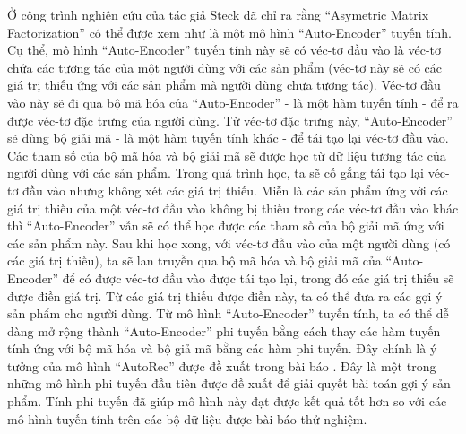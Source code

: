 Ở công trình nghiên cứu \cite{AMF} của tác giả Steck đã chỉ ra rằng “Asymetric Matrix Factorization” có thể được xem như là một mô hình “Auto-Encoder” tuyến tính. 
Cụ thể, mô hình ``Auto-Encoder'' tuyến tính này sẽ có véc-tơ đầu vào là véc-tơ chứa các tương tác của một người dùng với các sản phẩm (véc-tơ này sẽ có các giá trị thiếu ứng với các sản phẩm mà người dùng chưa tương tác). 
Véc-tơ đầu vào này sẽ đi qua bộ mã hóa của ``Auto-Encoder'' - là một hàm tuyến tính - để ra được véc-tơ đặc trưng của người dùng. 
Từ véc-tơ đặc trưng này, ``Auto-Encoder'' sẽ dùng bộ giải mã - là một hàm tuyến tính khác - để tái tạo lại véc-tơ đầu vào. 
Các tham số của bộ mã hóa và bộ giải mã sẽ được học từ dữ liệu tương tác của người dùng với các sản phẩm. 
Trong quá trình học, ta sẽ cố gắng tái tạo lại véc-tơ đầu vào nhưng không xét các giá trị thiếu. 
Miễn là các sản phẩm ứng với các giá trị thiếu của một véc-tơ đầu vào không bị thiếu trong các véc-tơ đầu vào khác thì ``Auto-Encoder'' vẫn sẽ có thể học được các tham số của bộ giải mã ứng với các sản phẩm này. 
Sau khi học xong, với véc-tơ đầu vào của một người dùng (có các giá trị thiếu), ta sẽ lan truyền qua bộ mã hóa và bộ giải mã của ``Auto-Encoder'' để có được véc-tơ đầu vào được tái tạo lại, trong đó các giá trị thiếu sẽ được điền giá trị. 
Từ các giá trị thiếu được điền này, ta có thể đưa ra các gợi ý sản phẩm cho người dùng. 
Từ mô hình ``Auto-Encoder'' tuyến tính, ta có thể dễ dàng mở rộng thành ``Auto-Encoder'' phi tuyến bằng cách thay các hàm tuyến tính ứng với bộ mã hóa và bộ giả mã bằng các hàm phi tuyến. 
Đây chính là ý tưởng của mô hình ``AutoRec'' được đề xuất trong bài báo \cite{autorec}. 
Đây là một trong những mô hình phi tuyến đầu tiên được đề xuất để giải quyết bài toán gợi ý sản phẩm. 
Tính phi tuyến đã giúp mô hình này đạt được kết quả tốt hơn so với các mô hình tuyến tính trên các bộ dữ liệu được bài báo thử nghiệm.


